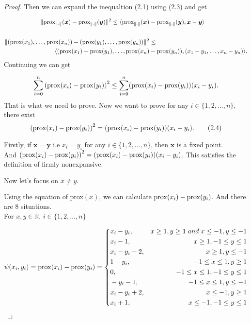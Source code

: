 \documentclass{report}
\begin{document}
\begin{proof}
    Then we can expand the inequaltion (2.1) using (2.3) and get 

    \begin{align*}
        \Vert {\rm prox}_{\Vert \cdot\Vert}(\bm x) - {\rm prox}_{\Vert \cdot\Vert}(\bm y)\Vert^2 \leq \langle {\rm prox}_{\Vert \cdot\Vert}(\bm x)& - {\rm prox}_{\Vert \cdot\Vert}(\bm y),\bm x-\bm y\rangle \\
        \\
        \Vert ({\rm prox}(x_1),\dots,{\rm prox}(x_n)) - ({\rm prox}(y_1),\dots,{\rm prox}(y_n))\Vert^2 &\leq \\
        \langle ({\rm prox}(x_1)-{\rm prox}(y_1),\dots,{\rm prox}(x_n)&-{\rm prox}(y_n)),(x_1-y_1,\dots,x_n-y_n)\rangle. \\
    \end{align*}
    Continuing we can get 

    \begin{align*}
       \sum_{i=0}^n{({\rm prox}(x_i)-{\rm prox}(y_i))}^2 \leq \sum_{i=0}^n({\rm prox}(x_i)-{\rm prox}(y_i))(x_i-y_i).
    \end{align*}
    That is what we need to prove. 
    Now we want to prove for any $i\in \{1,2,\dots,n\}$, there exist 
    \begin{align}
        {({\rm prox}(x_i)-{\rm prox}(y_i))}^2=({\rm prox}(x_i)-{\rm prox}(y_i))(x_i-y_i). \tag{2.4}
    \end{align}

    Firstly, if ${\bm x}={\bm y}$ i.e $x_i=y_i$ for any $i\in \{1,2,\dots,n\}$, 
    then $\bm x$ is a fixed point. \\
    And ${({\rm prox}(x_i)-{\rm prox}(y_i))}^2=({\rm prox}(x_i)-{\rm prox}(y_i))(x_i-y_i)$. 
    This satisfies the definition of firmly nonexpansive. 

    Now let's focus on $x\neq y$. 

    \par Using the equation of prox$(x)$, we can calculate ${\rm prox}(x_i)-{\rm prox}(y_i)$. 
    And there are 8 situations. \\
    For $x,y \in \mathbb{R}$, $i\in \{1,2,\dots,n\}$

    \[
        \psi(x_i,y_i) ={\rm prox}(x_i)-{\rm prox}(y_i)=\left\{
        \begin{aligned}
        &x_i-y_i,   &x\geq 1,y\geq 1 \; and \; x\leq -1,y\leq -1\\
        &x_i-1,     &x\geq 1,-1\leq y\leq 1 \\
        &x_i-y_i-2, &x\geq 1,y\leq -1 \\
        &1-y_i,     &-1\leq x\leq 1,y\geq 1 \\
        &0,         &-1\leq x\leq 1,-1\leq y\leq 1 \\
        &-y_i-1,    &-1\leq x\leq 1,y\leq -1\\
        &x_i-y_i+2, &x\leq -1,y\geq 1 \\
        &x_i+1,     &x\leq -1,-1\leq y\leq 1
        \end{aligned}
        \right.
    \]
    

\end{proof}
\end{document}
